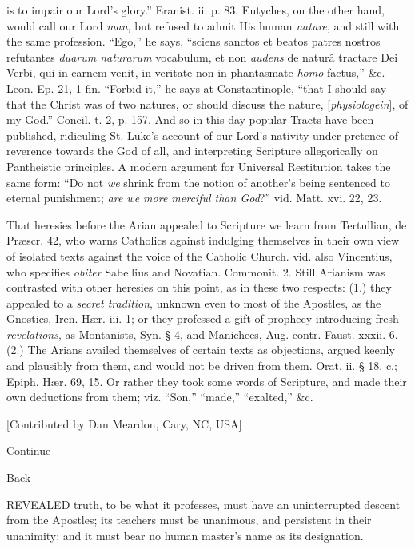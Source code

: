 is to impair our Lord's glory.'' Eranist. ii. p. 83. Eutyches, on the
other hand, would call our Lord \emph{man},
but refused to admit His human \emph{nature},
and still with the same profession. ``Ego,'' he says, ``sciens sanctos et
beatos patres nostros refutantes \emph{duarum
naturarum} vocabulum, et non \emph{audens}
de naturâ tractare Dei Verbi, qui in carnem venit, in veritate non in
phantasmate \emph{homo} factus,''
\&c. Leon. Ep. 21, 1 fin. ``Forbid it,'' he says at Constantinople, ``that
I should say that the Christ was of two natures, or should discuss the
nature, [\emph{physiologein}], of my God.'' Concil. t. 2,
p. 157. And so in this day popular Tracts have been published,
ridiculing St. Luke's account of our Lord's nativity under pretence of
reverence towards the God of all, and interpreting Scripture
allegorically on Pantheistic principles. A modern argument for
Universal Restitution takes the same form: ``Do not \emph{we}
shrink from the notion of another's being sentenced to eternal
punishment; \emph{are we more merciful
than God}?'' vid. Matt. xvi. 22, 23.

That heresies before the Arian appealed to
Scripture we learn from Tertullian, de Præscr. 42, who warns
Catholics against indulging themselves in their own view of isolated
texts against the voice of the Catholic Church. vid. also Vincentius,
who specifies \emph{obiter} Sabellius and Novatian. Commonit. 2. Still Arianism was
contrasted with other heresies on this point, as in these two
respects: (1.) they appealed to a \emph{secret
tradition}, unknown even to most of the Apostles, as the Gnostics,
Iren. Hær. iii. 1; or they professed a gift of prophecy introducing
fresh \emph{revelations}, as Montanists, Syn. § 4, and Manichees, Aug. contr. Faust. xxxii. 6. (2.) The
Arians availed themselves of certain texts as objections, argued
keenly and plausibly from them, and would not be driven from them.
Orat. ii. § 18, c.;
Epiph. Hær. 69, 15. Or rather they took some words of Scripture, and
made their own deductions from them; viz. ``Son,'' ``made,'' ``exalted,''
\&c.

[Contributed by Dan Meardon, Cary, NC, USA]

Continue

Back


REVEALED truth, to be what it professes, must have an
uninterrupted descent from the Apostles; its teachers must be
unanimous, and persistent in their unanimity; and it must bear no
human master's name as its designation.

